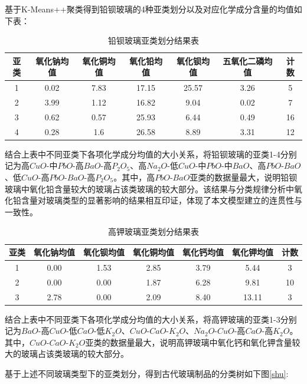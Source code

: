 \documentclass[withoutpreface,bwprint]{cumcmthesis} %
\begin{document}
基于K-Means++聚类得到铅钡玻璃的4种亚类划分以及对应化学成分含量的均值如下表：

\begin{table}[H]
  \centering
  \caption{铅钡玻璃亚类划分结果表}
  \begin{tabular}{ccccccc}
    \toprule[1.5pt]
    亚类          & 氧化钠均值    & 氧化铜均值    & 氧化铅均值    & 氧化钡均值    & 五氧化二磷均值  & 计数 \\ \hline
    1 & 0.02  & 7.83     & 17.15  & 25.57   & 3.26 & 5  \\
    2 & 3.99 & 1.12 & 16.82 & 9.04    & 0.02     & 7  \\
    3        & 0.62  & 0.57  & 25.93 & 6.44 & 0.49  & 16 \\
    4  & 0.28 & 1.6 & 26.58 & 8.89 & 3.31 & 12\\
    \bottomrule[1.5pt]
  \end{tabular}
\end{table}


结合上表中不同亚类下各项化学成分均值的大小关系，将铅钡玻璃的亚类1-4分别记为高$CuO$-中$PbO$-高$BaO$-高$P_2O_5$、高$Na_2O$-低$CuO$-中$PbO$-中$BaO$、高$PbO$-$BaO$、低$CuO$-高$PbO$-$BaO$-高$P_2O_5$。其中，高$PbO$-$BaO$亚类的数据量最大，说明铅钡玻璃中氧化铅含量较大的玻璃占该类玻璃的较大部分。该结果与分类规律分析中氧化铅含量对玻璃类型的显著影响的结果相互印证，体现了本文模型建立的连贯性与一致性。

\begin{table}[H]
  \centering
  \caption{高钾玻璃亚类划分结果表}
  \begin{tabular}{ccccccc}
    \toprule[1.5pt]
    亚类 & 氧化钠均值 & 氧化钡均值 & 氧化铜均值 & 氧化钙均值 & 氧化钾均值 & 计数 \\ \hline
    1  & 0.00  & 1.53  & 2.85  & 3.79  & 5.44  & 3  \\
    2  & 0.00  & 0.00  & 1.87  & 6.28  & 9.81  & 10 \\
    3  & 2.78  & 0.00  & 2.09  & 8.40  & 13.11 & 3  \\ \bottomrule[1.5pt]
  \end{tabular}
\end{table}

结合上表中不同亚类下各项化学成分均值的大小关系，将高钾玻璃的亚类1-3分别记为$BaO$-高$CuO$-低$CaO$-低$K_2O$、$CuO$-$CaO$-$K_2O$、$Na_2O$-$CuO$-高$CaO$-高$K_2O$。其中，$CuO$-$CaO$-$K_2O$亚类的数据量最大，说明高钾玻璃中氧化钙和氧化钾含量较大的玻璃占该类玻璃的较大部分。

基于上述不同玻璃类型下的亚类划分，得到古代玻璃制品的分类树如下图\ref{shu}:
\end{document}
